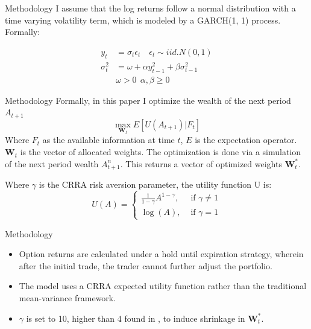 \documentclass[9pt]{beamer}
\begin{document}
\begin{frame}{Methodology}
I assume that the log returns follow a normal distribution with a time varying volatility term, which is modeled by a GARCH(1, 1) process. Formally:

\begin{align}
\nonumber y_{t} &= \sigma_{t} \epsilon_{t} \quad \epsilon_{t} \sim iid.N(0, 1)
\\ \nonumber \sigma_{t}^{2} &= \omega + \alpha y_{t - 1}^{2} + \beta \sigma_{t - 1}^{2}
\\ \nonumber & \omega > 0 \ \ \alpha, \beta \geq 0
\end{align}
\end{frame}

\begin{frame}{Methodology}
Formally, in this paper I optimize the wealth of the next period $A_{t + 1}$
\[\max_{\mathbf{W}_{t}} E[U(A_{t+1})|F_{t}]\]
Where $F_{t}$ as the available information at time $t$, $E$ is the expectation operator. $\mathbf{W}_{t}$ is the vector of allocated weights. The optimization is done via a simulation of the next period wealth $A_{t+1}^{n}$. This returns a vector of optimized weights $\mathbf{W}_{t}^{*}$.

\vspace{1cm}
Where $\gamma$ is the CRRA risk aversion parameter, the utility function U is:
\[U(A)=\left\{\begin{array}{ll}\frac{1}{1-\gamma} A^{1-\gamma}, & \text { if } \gamma \neq 1 \\ \log (A), & \text { if } \gamma=1\end{array}\right.\]
\end{frame}

\begin{frame}{Methodology}
    \begin{itemize}
        \item Option returns are calculated under a hold until expiration strategy, wherein after the initial trade, the trader cannot further adjust the portfolio.
        \item The model uses a CRRA expected utility function rather than the traditional mean-variance framework.
        \item $\gamma$ is set to 10, higher than 4 found in \cite{bliss2004option}, to induce shrinkage in $\mathbf{W}_{t}^{*}$.
    \end{itemize}
\end{frame}
\end{document}
